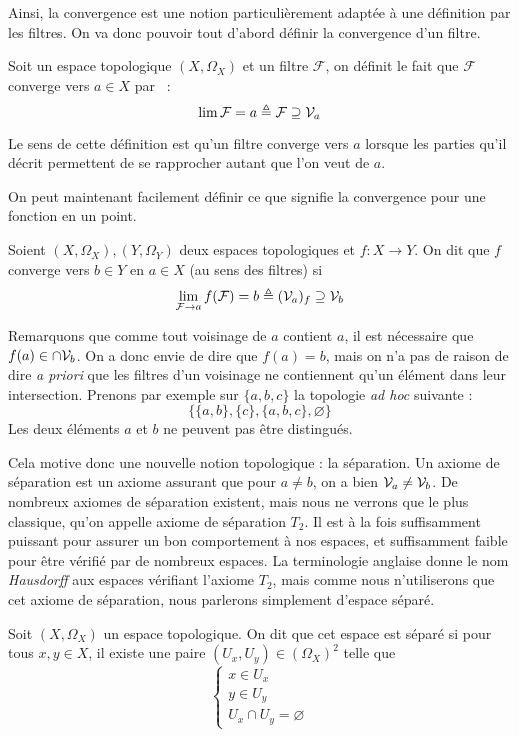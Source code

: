 Ainsi, la convergence est une notion particulièrement adaptée à une définition
par les filtres. On va donc pouvoir tout d'abord définir la convergence d'un
filtre.

\begin{definition}
  Soit un espace topologique $(X,\Omega_X)$ et un filtre $\mathcal F$, on
  définit le fait que $\mathcal F$ converge vers $a\in X$ par~ :
  \[\lim \mathcal F = a \triangleq \mathcal F \supseteq \mathcal{V}_a\]
\end{definition}

Le sens de cette définition est qu'un filtre converge vers $a$ lorsque les
parties qu'il décrit permettent de se rapprocher autant que l'on veut de
$a$.

On peut maintenant facilement définir ce que signifie la convergence pour une
fonction en un point.

\begin{definition}
  Soient $(X,\Omega_X),(Y,\Omega_Y)$ deux espaces topologiques et $f : X \to Y$.
  On dit que $f$ converge vers $b\in Y$ en $a\in X$ (au sens des filtres) si
  \[\lim_{\mathcal F \to a}f(\mathcal F) = b\triangleq (\mathcal{V}_a)_f \supseteq\mathcal{V}_b\]
\end{definition}

Remarquons que comme tout voisinage de $a$ contient $a$, il est nécessaire que
$f(a)\in\cap\mathcal{V}_b$. On a donc envie de dire que $f(a)=b$, mais on n'a pas de
raison de dire \textit{a priori} que les filtres d'un voisinage ne contiennent
qu'un élément dans leur intersection. Prenons par exemple sur $\{a,b,c\}$ la
topologie \textit{ad hoc} suivante :
\[\{\{a,b\},\{c\},\{a,b,c\},\varnothing\}\]
Les deux éléments $a$ et $b$ ne peuvent pas être distingués.

Cela motive donc une nouvelle notion topologique : la séparation. Un axiome de
séparation est un axiome assurant que pour $a\neq b$, on a bien
$\mathcal{V}_a\neq\mathcal{V}_b$. De nombreux axiomes de séparation existent, mais nous ne
verrons que le plus classique, qu'on appelle axiome de séparation $T_2$. Il est
à la fois suffisamment puissant pour assurer un bon comportement à nos espaces,
et suffisamment faible pour être vérifié par de nombreux espaces. La
terminologie anglaise donne le nom \textit{Hausdorff} aux espaces vérifiant
l'axiome $T_2$, mais comme nous n'utiliserons que cet axiome de séparation, nous
parlerons simplement d'espace séparé.

\begin{definition}
  Soit $(X,\Omega_X)$ un espace topologique. On dit que cet espace est séparé
  si pour tous $x,y\in X$, il existe une paire $(U_x,U_y)\in (\Omega_X)^2$ telle
  que
  \[\begin{cases}
  x\in U_x\\
  y\in U_y\\
  U_x\cap U_y = \varnothing
  \end{cases}\]
\end{definition}

